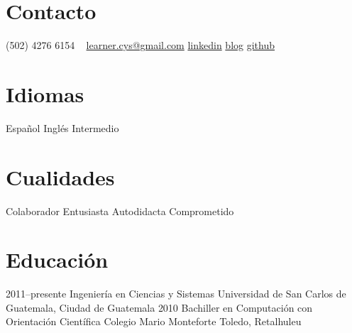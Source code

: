 \documentclass[]{friggeri-cv} %
\begin{document}


\begin{aside} %
\section{Contacto}
 (502) 4276 6154
~
\href{mailto:learner.cys@gmail.com}{learner.cys@gmail.com}
\href{https://www.linkedin.com/pub/carlos-hern\%C3\%A1ndez/87/1b1/157}{linkedin}
\href{http://learnercys.wordpress.com/}{blog}
\href{https://github.com/learnercys}{github}
\section{Idiomas}
Español
Inglés Intermedio 
\section{Cualidades}
Colaborador
Entusiasta
Autodidacta
Comprometido
\end{aside}


\section{Educación}

\begin{entrylist}
\entry
{2011--presente}
{Ingeniería {\normalfont en Ciencias y Sistemas}}
{Universidad de San Carlos de Guatemala, Ciudad de Guatemala	}
{}
\entry
{2010}
{Bachiller {\normalfont en Computación con Orientación Científica}}
{Colegio Mario Monteforte Toledo, Retalhuleu}
{}
\end{entrylist}

\end{document}
